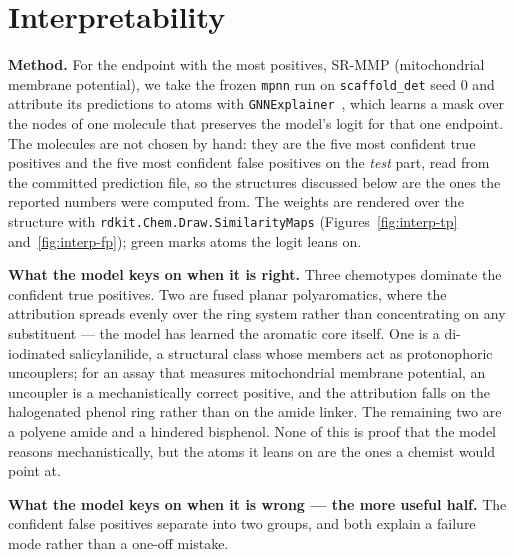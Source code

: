 \section{Interpretability}
\label{sec:interpretability}

\textbf{Method.} For the endpoint with the most positives, SR-MMP (mitochondrial membrane
potential), we take the frozen \texttt{mpnn} run on \texttt{scaffold\_det} seed 0 and attribute
its predictions to atoms with \texttt{GNNExplainer}~\cite{ying2019gnnexplainer}, which learns a
mask over the nodes of one molecule that preserves the model's logit for that one endpoint. The
molecules are not chosen by hand: they are the five most confident true positives and the five
most confident false positives on the \emph{test} part, read from the committed prediction file,
so the structures discussed below are the ones the reported numbers were computed from. The
weights are rendered over the structure with \texttt{rdkit.Chem.Draw.SimilarityMaps}
(Figures~\ref{fig:interp-tp} and~\ref{fig:interp-fp}); green marks atoms the logit leans on.

\textbf{What the model keys on when it is right.} Three chemotypes dominate the confident true
positives. Two are fused planar polyaromatics, where the attribution spreads evenly over the ring
system rather than concentrating on any substituent --- the model has learned the aromatic core
itself. One is a di-iodinated salicylanilide, a structural class whose members act as
protonophoric uncouplers; for an assay that measures mitochondrial membrane potential, an
uncoupler is a mechanistically correct positive, and the attribution falls on the halogenated
phenol ring rather than on the amide linker. The remaining two are a polyene amide and a hindered
bisphenol. None of this is proof that the model reasons mechanistically, but the atoms it leans
on are the ones a chemist would point at.

\textbf{What the model keys on when it is wrong --- the more useful half.} The confident false
positives separate into two groups, and both explain a failure mode rather than a one-off
mistake.

